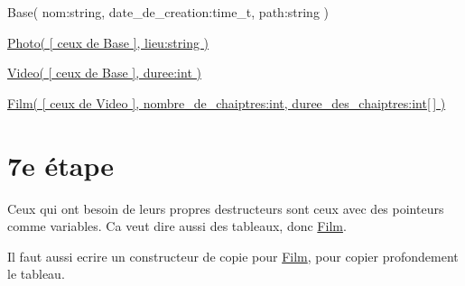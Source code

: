 
\begin{DoxyItemize}
\item Base( nom\+:string, date\+\_\+de\+\_\+creation\+:time\+\_\+t, path\+:string )
\item \hyperlink{classPhoto}{Photo( \mbox{[} ceux de Base \mbox{]}, lieu\+:string )}
\item \hyperlink{classVideo}{Video( \mbox{[} ceux de Base \mbox{]}, duree\+:int )}
\item \hyperlink{classFilm}{Film( \mbox{[} ceux de Video \mbox{]}, nombre\+\_\+de\+\_\+chaiptres\+:int, duree\+\_\+des\+\_\+chaiptres\+:int\mbox{[}$\,$\mbox{]} )}
\end{DoxyItemize}

\section*{7e étape }

Ceux qui ont besoin de leurs propres destructeurs sont ceux avec des pointeurs comme variables. Ca veut dire aussi des tableaux, donc \hyperlink{classFilm}{Film}.

Il faut aussi ecrire un constructeur de copie pour \hyperlink{classFilm}{Film}, pour copier profondement le tableau. 